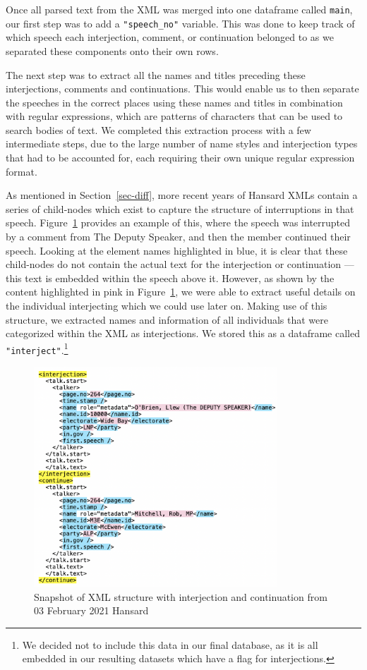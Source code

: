 \documentclass[
  letterpaper,
  DIV=11,
  numbers=noendperiod]{scrartcl}
\begin{document}
Once all parsed text from the XML was merged into one dataframe called
\texttt{main}, our first step was to add a \texttt{"speech\_no"}
variable. This was done to keep track of which speech each interjection,
comment, or continuation belonged to as we separated these components
onto their own rows.

The next step was to extract all the names and titles preceding these
interjections, comments and continuations. This would enable us to then
separate the speeches in the correct places using these names and titles
in combination with regular expressions, which are patterns of
characters that can be used to search bodies of text. We completed this
extraction process with a few intermediate steps, due to the large
number of name styles and interjection types that had to be accounted
for, each requiring their own unique regular expression format.

As mentioned in Section~\ref{sec-diff}, more recent years of Hansard
XMLs contain a series of child-nodes which exist to capture the
structure of interruptions in that speech. Figure~\ref{fig-xml3}
provides an example of this, where the speech was interrupted by a
comment from The Deputy Speaker, and then the member continued their
speech. Looking at the element names highlighted in blue, it is clear
that these child-nodes do not contain the actual text for the
interjection or continuation --- this text is embedded within the speech
above it. However, as shown by the content highlighted in pink in
Figure~\ref{fig-xml3}, we were able to extract useful details on the
individual interjecting which we could use later on. Making use of this
structure, we extracted names and information of all individuals that
were categorized within the XML as interjections. We stored this as a
dataframe called \texttt{"interject"}.\footnote{We decided not to
  include this data in our final database, as it is all embedded in our
  resulting datasets which have a flag for interjections.}

\begin{figure}

{\centering \includegraphics[width=3.59375in,height=\textheight]{xml3.png}

}

\caption{\label{fig-xml3}Snapshot of XML structure with interjection and
continuation from 03 February 2021 Hansard}

\end{figure}
\end{document}
